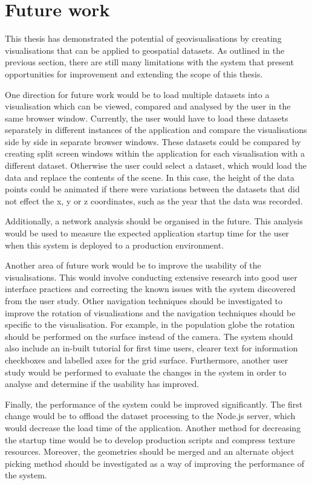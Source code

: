 \section{Future work} {
\label{sec:future_work}

	This thesis has demonstrated the potential of geovisualisations by creating visualisations that can be applied to geospatial datasets. As outlined in the previous section, there are still many limitations with the system that present opportunities for improvement and extending the scope of this thesis.

	One direction for future work would be to load multiple datasets into a visualisation which can be viewed, compared and analysed by the user in the same browser window. Currently, the user would have to load these datasets separately in different instances of the application and compare the visualisations side by side in separate browser windows. These datasets could be compared by creating split screen windows within the application for each visualisation with a different dataset. Otherwise the user could select a dataset, which would load the data and replace the contents of the scene. In this case, the height of the data points could be animated if there were variations between the datasets that did not effect the x, y or z coordinates, such as the year that the data was recorded.

	Additionally, a network analysis should be organised in the future. This analysis would be used to measure the expected application startup time for the user when this system is deployed to a production environment.

	Another area of future work would be to improve the usability of the visualisations. This would involve conducting extensive research into good user interface practices and correcting the known issues with the system discovered from the user study. Other navigation techniques should be investigated to improve the rotation of visualisations and the navigation techniques should be specific to the visualisation. For example, in the population globe the rotation should be performed on the surface instead of the camera. The system should also include an in-built tutorial for first time users, clearer text for information checkboxes and labelled axes for the grid surface. Furthermore, another user study would be performed to evaluate the changes in the system in order to analyse and determine if the usability has improved.

	Finally, the performance of the system could be improved significantly. The first change would be to offload the dataset processing to the Node.js server, which would decrease the load time of the application. Another method for decreasing the startup time would be to develop production scripts and compress texture resources. Moreover, the geometries should be merged and an alternate object picking method should be investigated as a way of improving the performance of the system.

}
